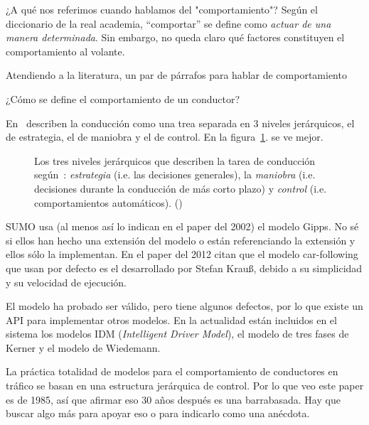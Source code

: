 ¿A qué nos referimos cuando hablamos del "comportamiento"? Según el diccionario de la real academia, \enquote{comportar} se define como \textit{actuar de una manera determinada}. Sin embargo, no queda claro qué factores constituyen el comportamiento al volante.

Atendiendo a la literatura, \TODO un par de párrafos para hablar de comportamiento

¿Cómo se define el comportamiento de un conductor?

En~\cite{michon1985critical} describen la conducción como una trea separada en $3$ niveles jerárquicos, el de estrategia, el de maniobra y el de control. En la figura~\ref{fig:three-levels-of-human-driving}. se ve mejor.
\begin{figure}
	\centering
{}
	\caption{Los tres niveles jerárquicos que describen la tarea de conducción según~\cite{michon1985critical}: \textit{estrategia} (i.e. las decisiones generales), la \textit{maniobra} (i.e. decisiones durante la conducción de más corto plazo) y \textit{control} (i.e. comportamientos automáticos). ()}
	\label{fig:three-levels-of-human-driving}
\end{figure}

SUMO usa (al menos así lo indican en el paper del 2002) el modelo Gipps\cite{krajzewicz2002sumo}. No sé si ellos han hecho una extensión del modelo o están referenciando la extensión y ellos sólo la implementan. En el paper del 2012 citan que el modelo car-following que usan por defecto es el desarrollado por Stefan Krauß\cite{jin2016evaluation}, debido a su simplicidad y su velocidad de ejecución.

El modelo ha probado ser válido, pero tiene algunos defectos, por lo que existe un API para implementar otros modelos. En la actualidad están incluidos en el sistema los modelos IDM\cite{treiber2000congested} (\textit{Intelligent Driver Model}), el modelo de tres fases de Kerner\cite{kerner2008testbed} y el modelo de Wiedemann\cite{wiedemann1974simulation}.

La práctica totalidad de modelos para el comportamiento de conductores en tráfico se basan en una estructura jerárquica de control\cite{michon1985critical}. Por lo que veo este paper es de 1985, así que afirmar eso 30 años después es una barrabasada. Hay que buscar algo más para apoyar eso o para indicarlo como una anécdota.

